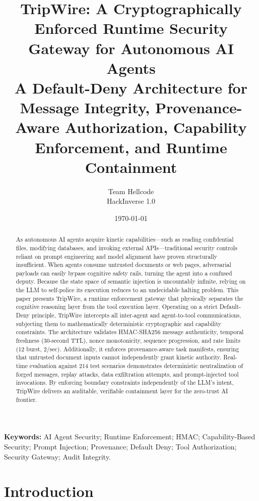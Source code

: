 \documentclass[10pt,a4paper]{article}
\title{
    \Large\bfseries
    TripWire: A Cryptographically Enforced Runtime Security Gateway for Autonomous AI Agents\\[0.35em]
    \normalsize
    A Default-Deny Architecture for Message Integrity, Provenance-Aware Authorization, Capability Enforcement, and Runtime Containment
}
\author{
    Team Hellcode\\
    \small HackInverse 1.0
}
\date{\today}
\begin{document}
\maketitle

\vspace{1.5em}
\renewcommand{\abstractname}{\Large\bfseries Abstract}
\begin{abstract}
\normalsize
As autonomous AI agents acquire kinetic capabilities---such as reading confidential files, modifying databases, and invoking external APIs---traditional security controls reliant on prompt engineering and model alignment have proven structurally insufficient. When agents consume untrusted documents or web pages, adversarial payloads can easily bypass cognitive safety rails, turning the agent into a confused deputy. Because the state space of semantic injection is uncountably infinite, relying on the LLM to self-police its execution reduces to an undecidable halting problem. This paper presents TripWire, a runtime enforcement gateway that physically separates the cognitive reasoning layer from the tool execution layer. Operating on a strict Default-Deny principle, TripWire intercepts all inter-agent and agent-to-tool communications, subjecting them to mathematically deterministic cryptographic and capability constraints. The architecture validates HMAC-SHA256 message authenticity, temporal freshness (30-second TTL), nonce monotonicity, sequence progression, and rate limits (12 burst, 2/sec). Additionally, it enforces provenance-aware task manifests, ensuring that untrusted document inputs cannot independently grant kinetic authority. Real-time evaluation against 214 test scenarios demonstrates deterministic neutralization of forged messages, replay attacks, data exfiltration attempts, and prompt-injected tool invocations. By enforcing boundary constraints independently of the LLM's intent, TripWire delivers an auditable, verifiable containment layer for the zero-trust AI frontier.
\end{abstract}

\vspace{1em}
\textbf{Keywords:} AI Agent Security; Runtime Enforcement; HMAC; Capability-Based Security; Prompt Injection; Provenance; Default Deny; Tool Authorization; Security Gateway; Audit Integrity.

\clearpage

\section{Introduction}
\end{document}
